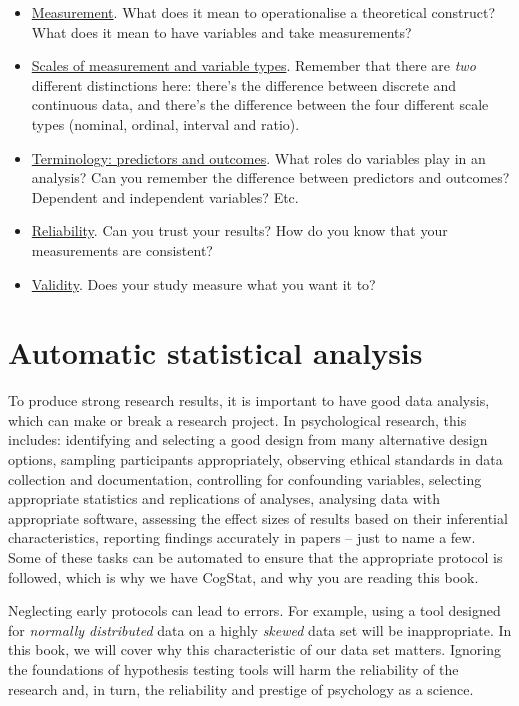 \documentclass[
  11pt,
  a4paper,
  twoside,symmetric,openright]{book}
\providecommand{\tightlist}{%
  \setlength{\itemsep}{0pt}\setlength{\parskip}{0pt}}
\theoremstyle{break}
\theoremstyle{break}
\begin{document}
\begin{itemize}
\tightlist
\item
  \protect\hyperlink{measurement}{Measurement}. What does it mean to operationalise a theoretical construct? What does it mean to have variables and take measurements?
\item
  \protect\hyperlink{scales}{Scales of measurement and variable types}. Remember that there are \emph{two} different distinctions here: there's the difference between discrete and continuous data, and there's the difference between the four different scale types (nominal, ordinal, interval and ratio).
\item
  \protect\hyperlink{ivdv}{Terminology: predictors and outcomes}. What roles do variables play in an analysis? Can you remember the difference between predictors and outcomes? Dependent and independent variables? Etc.
\item
  \protect\hyperlink{reliability}{Reliability}. Can you trust your results? How do you know that your measurements are consistent?
\item
  \protect\hyperlink{validity}{Validity}. Does your study measure what you want it to?
\end{itemize}

\hypertarget{autostat}{%
\chapter{Automatic statistical analysis}\label{autostat}}

To produce strong research results, it is important to have good data analysis, which can make or break a research project. In psychological research, this includes: identifying and selecting a good design from many alternative design options, sampling participants appropriately, observing ethical standards in data collection and documentation, controlling for confounding variables, selecting appropriate statistics and replications of analyses, analysing data with appropriate software, assessing the effect sizes of results based on their inferential characteristics, reporting findings accurately in papers -- just to name a few. Some of these tasks can be automated to ensure that the appropriate protocol is followed, which is why we have CogStat, and why you are reading this book.

Neglecting early protocols can lead to errors. For example, using a tool designed for \emph{normally distributed} data on a highly \emph{skewed} data set will be inappropriate. In this book, we will cover why this characteristic of our data set matters. Ignoring the foundations of hypothesis testing tools will harm the reliability of the research and, in turn, the reliability and prestige of psychology as a science.
\end{document}
